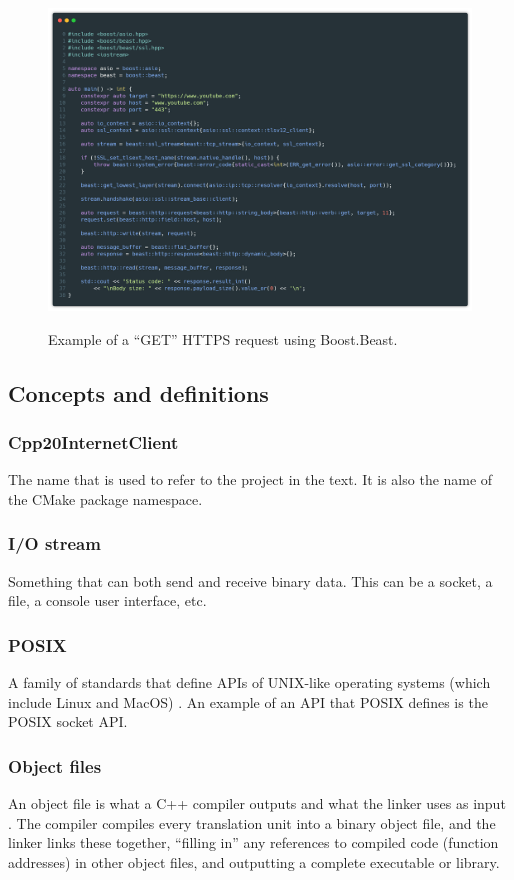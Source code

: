 \documentclass[12pt, a4paper]{article}
\begin{document}
\begin{figure}[hp]
	\centering
	\caption{Example of a “GET” HTTPS request using Boost.Beast.}
	\includegraphics[width=\textwidth]{boost_beast_example}
	\label{fig:boost_beast_example}
\end{figure}

\clearpage
\subsection{Concepts and definitions}
\subsubsection{Cpp20InternetClient}
The name that is used to refer to the project in the text. It is also the name of the CMake package namespace.

\subsubsection{I/O stream}
Something that can both send and receive binary data. This can be a socket, a file, a console user interface, etc.

\subsubsection{POSIX}
A family of standards that define APIs of UNIX-like operating systems (which include Linux and MacOS) \parencite{Posix}. An example of an API that POSIX defines is the POSIX socket API.

\subsubsection{Object files}
An object file is what a C++ compiler outputs and what the linker uses as input \parencite{UnderstandingCompilation}. The compiler compiles every translation unit into a binary object file, and the linker links these together, “filling in” any references to compiled code (function addresses) in other object files, and outputting a complete executable or library.
\end{document}
